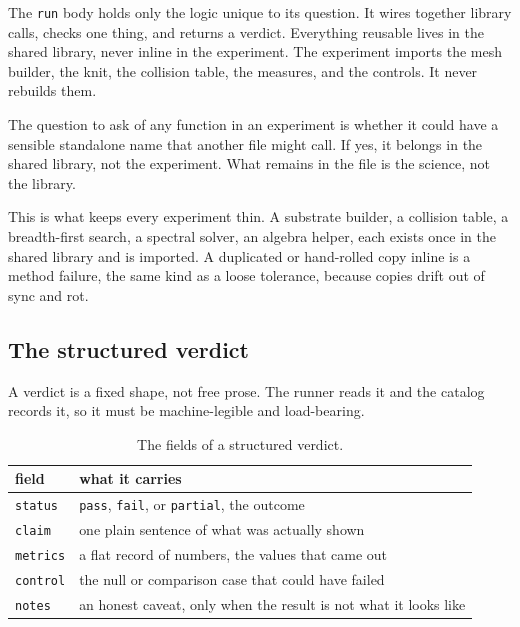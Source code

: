 The \texttt{run} body holds only the logic unique to its question. It wires together library calls, checks one thing, and returns a verdict. Everything reusable lives in the shared library, never inline in the experiment. The experiment imports the mesh builder, the knit, the collision table, the measures, and the controls. It never rebuilds them.

\begin{principle}
The question to ask of any function in an experiment is whether it could have a sensible standalone name that another file might call. If yes, it belongs in the shared library, not the experiment. What remains in the file is the science, not the library.
\end{principle}

This is what keeps every experiment thin. A substrate builder, a collision table, a breadth-first search, a spectral solver, an algebra helper, each exists once in the shared library and is imported. A duplicated or hand-rolled copy inline is a method failure, the same kind as a loose tolerance, because copies drift out of sync and rot.

\subsection{The structured verdict}

A verdict is a fixed shape, not free prose. The runner reads it and the catalog records it, so it must be machine-legible and load-bearing.

\begin{table}[ht]
\centering
\begin{tabular}{@{}ll@{}}
\toprule
field & what it carries \\
\midrule
\texttt{status} & \texttt{pass}, \texttt{fail}, or \texttt{partial}, the outcome \\
\texttt{claim} & one plain sentence of what was actually shown \\
\texttt{metrics} & a flat record of numbers, the values that came out \\
\texttt{control} & the null or comparison case that could have failed \\
\texttt{notes} & an honest caveat, only when the result is not what it looks like \\
\bottomrule
\end{tabular}
\caption{The fields of a structured verdict.}
\label{tab:verdict}
\end{table}

